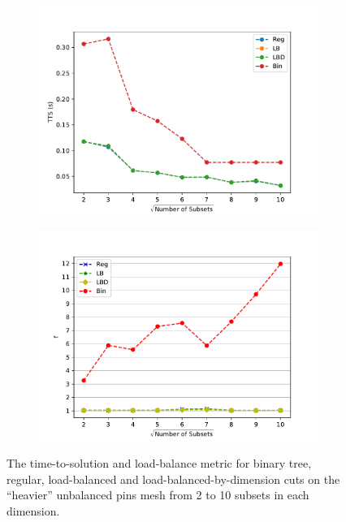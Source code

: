 \begin{figure}[h]
\centering
  \begin{subfigure}[t]{0.49\textwidth}
    \centering
\includegraphics[scale=0.55]{../../figures/more_sparse_comp.pdf}
  \end{subfigure}
  \begin{subfigure}[t]{0.49\textwidth}
    \centering
    \includegraphics[scale=0.55]{../../figures/more_sparse_metric_comp_bad.pdf}
  \end{subfigure}  
  \caption{The time-to-solution and load-balance metric for binary tree, regular, load-balanced and load-balanced-by-dimension cuts on the ``heavier'' unbalanced pins mesh from 2 to 10 subsets in each dimension.}
  \label{ubp_comp2}
\end{figure}
